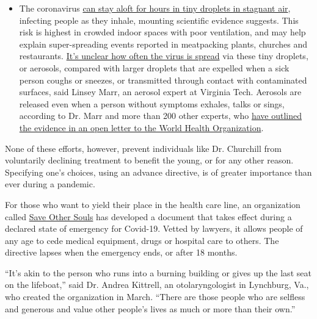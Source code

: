 \begin{itemize}
  \begin{itemize}
  \tightlist
  \item
    The coronavirus
    \href{https://www.nytimes3xbfgragh.onion/2020/07/04/health/239-experts-with-one-big-claim-the-coronavirus-is-airborne.html?action=click\&pgtype=Article\&state=default\&region=MAIN_CONTENT_3\&context=storylines_faq}{can
    stay aloft for hours in tiny droplets in stagnant air}, infecting
    people as they inhale, mounting scientific evidence suggests. This
    risk is highest in crowded indoor spaces with poor ventilation, and
    may help explain super-spreading events reported in meatpacking
    plants, churches and restaurants.
    \href{https://www.nytimes3xbfgragh.onion/2020/07/06/health/coronavirus-airborne-aerosols.html?action=click\&pgtype=Article\&state=default\&region=MAIN_CONTENT_3\&context=storylines_faq}{It's
    unclear how often the virus is spread} via these tiny droplets, or
    aerosols, compared with larger droplets that are expelled when a
    sick person coughs or sneezes, or transmitted through contact with
    contaminated surfaces, said Linsey Marr, an aerosol expert at
    Virginia Tech. Aerosols are released even when a person without
    symptoms exhales, talks or sings, according to Dr. Marr and more
    than 200 other experts, who
    \href{https://academic.oup.com/cid/article/doi/10.1093/cid/ciaa939/5867798}{have
    outlined the evidence in an open letter to the World Health
    Organization}.
  \end{itemize}
\end{itemize}

None of these efforts, however, prevent individuals like Dr. Churchill
from voluntarily declining treatment to benefit the young, or for any
other reason. Specifying one's choices, using an advance directive, is
of greater importance than ever during a pandemic.

For those who want to yield their place in the health care line, an
organization called \href{https://www.saveothersouls.org/}{Save Other
Souls} has developed a document that takes effect during a declared
state of emergency for Covid-19. Vetted by lawyers, it allows people of
any age to cede medical equipment, drugs or hospital care to others. The
directive lapses when the emergency ends, or after 18 months.

``It's akin to the person who runs into a burning building or gives up
the last seat on the lifeboat,'' said Dr. Andrea Kittrell, an
otolaryngologist in Lynchburg, Va., who created the organization in
March. ``There are those people who are selfless and generous and value
other people's lives as much or more than their own.''

